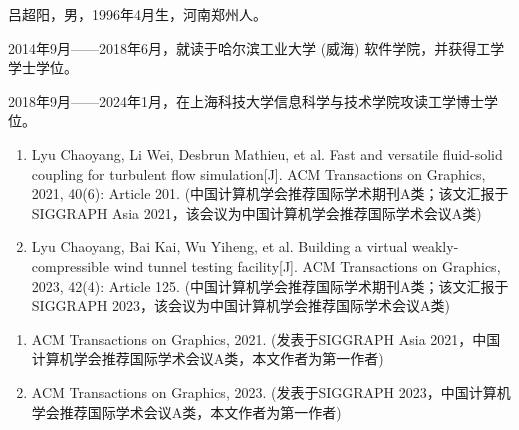 \documentclass[doctor]{shtthesis}
\makeatletter
\def\ifgraduate{\ifsht@graduate}
\makeatother
\begin{document}
\maketitle

\frontmatter


\makeindices

\ifgraduate

\fi

\mainmatter








\makebiblio

\backmatter


\ifgraduate
\begin{resume}
  吕超阳，男，1996年4月生，河南郑州人。

  2014年9月——2018年6月，就读于哈尔滨工业大学 (威海) 软件学院，并获得工学学士学位。

  2018年9月——2024年1月，在上海科技大学信息科学与技术学院攻读工学博士学位。  
\end{resume}

\begin{publications}
  \begin{enumerate}
    \item Lyu Chaoyang, Li Wei, Desbrun Mathieu, et al. Fast and versatile fluid-solid coupling for turbulent flow simulation[J]. ACM Transactions on Graphics, 2021, 40(6): Article 201. (中国计算机学会推荐国际学术期刊A类；该文汇报于SIGGRAPH Asia 2021，该会议为中国计算机学会推荐国际学术会议A类)
    \item Lyu Chaoyang, Bai Kai, Wu Yiheng, et al. Building a virtual weakly-compressible wind tunnel testing facility[J]. ACM Transactions on Graphics, 2023, 42(4): Article 125. (中国计算机学会推荐国际学术期刊A类；该文汇报于SIGGRAPH 2023，该会议为中国计算机学会推荐国际学术会议A类)
  \end{enumerate}
\end{publications}

\begin{publications*}
  \begin{enumerate}
    \item ACM Transactions on Graphics, 2021. (发表于SIGGRAPH Asia 2021，中国计算机学会推荐国际学术会议A类，本文作者为第一作者)
    \item ACM Transactions on Graphics, 2023. (发表于SIGGRAPH 2023，中国计算机学会推荐国际学术会议A类，本文作者为第一作者)
  \end{enumerate}
\end{publications*}



\fi
\end{document}
